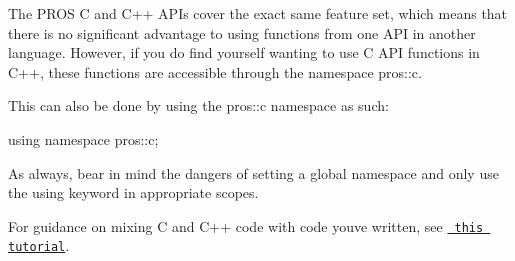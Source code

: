The P\+R\+OS C and C++ A\+P\+Is cover the exact same feature set, which means that there is no significant advantage to using functions from one A\+PI in another language. However, if you do find yourself wanting to use C A\+PI functions in C++, these functions are accessible through the namespace {\ttfamily pros\+::c}.

This can also be done by using the {\ttfamily pros\+::c} namespace as such\+: \begin{DoxyVerb}using namespace pros::c;
\end{DoxyVerb}


As always, bear in mind the dangers of setting a global namespace and only use the {\ttfamily using} keyword in appropriate scopes.

For guidance on mixing C and C++ code with code you\textquotesingle{}ve written, see \href{https://isocpp.org/wiki/faq/mixing-c-and-cpp}{\texttt{ this tutorial}}. 